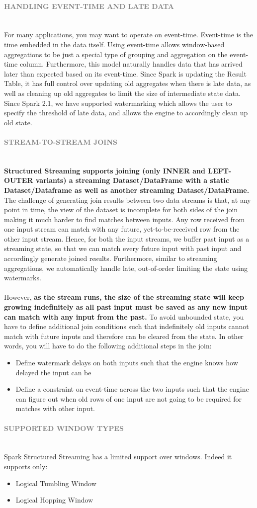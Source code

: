 \documentclass[10pt,a4paper]{article}
\newcommand{\nline}{\\~\\}
\newcommand{\myparagraph}[1]{\paragraph{\normalsize{\textcolor{gray}{\uppercase{\textbf{#1}}}} }\mbox{} \vspace{0.5em}\\}
\begin{document}
\myparagraph{Handling Event-time and Late Data}
For many applications, you may want to operate on event-time. Event-time is the time embedded in the data itself. Using event-time allows window-based aggregations to be just a special type of grouping and aggregation on the event-time column. Furthermore, this model naturally handles data that has arrived later than expected based on its event-time. Since Spark is updating the Result Table, it has full control over updating old aggregates when there is late data, as well as cleaning up old aggregates to limit the size of intermediate state data. Since Spark 2.1, we have supported watermarking which allows the user to specify the threshold of late data, and allows the engine to accordingly clean up old state.

\myparagraph{Stream-to-stream joins}
\textbf{Structured Streaming supports joining (only INNER and LEFT-OUTER variants) a streaming Dataset/DataFrame with a static Dataset/Dataframe as well as another streaming Dataset/DataFrame.} The challenge of generating join results between two data streams is that, at any point in time, the view of the dataset is incomplete for both sides of the join making it much harder to find matches between inputs. Any row received from one input stream can match with any future, yet-to-be-received row from the other input stream. Hence, for both the input streams, we buffer past input as a streaming state, so that we can match every future input with past input and accordingly generate joined results. Furthermore, similar to streaming aggregations, we automatically handle late, out-of-order limiting the state using watermarks.
\nline
However, \textbf{as the stream runs, the size of the streaming state will keep growing indefinitely as all past input must be saved as any new input can match with any input from the past.} To avoid unbounded state, you have to define additional join conditions such that indefinitely old inputs cannot match with future inputs and therefore can be cleared from the state. In other words, you will have to do the following additional steps in the join:
\begin{itemize}
	\item Define watermark delays on both inputs such that the engine knows how delayed the input can be
	\item Define a constraint on event-time across the two inputs such that the engine can figure out when old rows of one input are not going to be required for matches with other input.
\end{itemize}
\myparagraph{Supported Window Types}
Spark Structured Streaming has a limited support over windows. Indeed it supports only:
\begin{itemize}
	\item Logical Tumbling Window
	\item Logical Hopping Window
\end{itemize}
\end{document}
